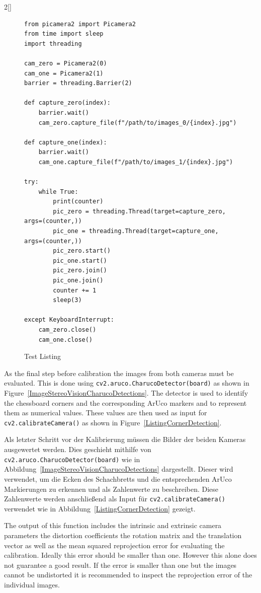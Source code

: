 \begin{paracol}{2}[]
\begin{figure}
	\begin{lstlisting}[style=shell]
from picamera2 import Picamera2
from time import sleep
import threading

cam_zero = Picamera2(0)
cam_one = Picamera2(1)
barrier = threading.Barrier(2)

def capture_zero(index):
	barrier.wait()
	cam_zero.capture_file(f"/path/to/images_0/{index}.jpg")

def capture_one(index):
	barrier.wait()
	cam_one.capture_file(f"/path/to/images_1/{index}.jpg")

try:
	while True:
		print(counter)
		pic_zero = threading.Thread(target=capture_zero, args=(counter,))
		pic_one = threading.Thread(target=capture_one, args=(counter,))
		pic_zero.start()
		pic_one.start()
		pic_zero.join()
		pic_one.join()
		counter += 1
		sleep(3)

except KeyboardInterrupt:
	cam_zero.close()
	cam_one.close()
	\end{lstlisting}
	\caption{Test Listing}
	\label{ListingTakingCalibrationPictures}
\end{figure}
\FloatBarrier

\colstart

As the final step before calibration the images from both cameras must be evaluated. This is done using \texttt{cv2.aruco.CharucoDetector(board)} as shown in Figure~\ref{ImageStereoVisionCharucoDetections}. The detector is used to identify the chessboard corners and the corresponding ArUco markers and to represent them as numerical values. These values are then used as input for \texttt{cv2.calibrateCamera()} as shown in Figure~\ref{ListingCornerDetection}.

\colger

Als letzter Schritt vor der Kalibrierung müssen die Bilder der beiden Kameras ausgewertet werden. Dies geschieht mithilfe von \texttt{cv2.aruco.CharucoDetector(board)} wie in Abbildung~\ref{ImageStereoVisionCharucoDetections} dargestellt. Dieser wird verwendet, um die Ecken des Schachbretts und die entsprechenden ArUco Markierungen zu erkennen und als Zahlenwerte zu beschreiben. Diese Zahlenwerte werden anschließend als Input für \texttt{cv2.calibrateCamera()} verwendet wie in Abbildung~\ref{ListingCornerDetection} gezeigt.

\coleng

The output of this function includes the intrinsic and extrinsic camera parameters the distortion coefficients the rotation matrix and the translation vector as well as the mean squared reprojection error for evaluating the calibration. Ideally this error should be smaller than one. However this alone does not guarantee a good result. If the error is smaller than one but the images cannot be undistorted it is recommended to inspect the reprojection error of the individual images.


\end{paracol}
